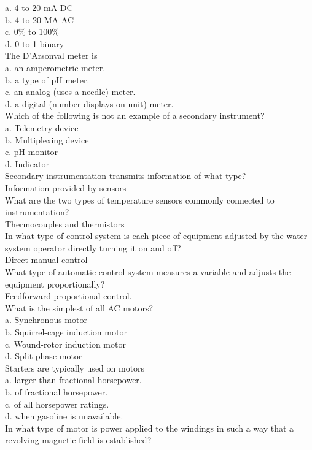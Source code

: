 a.	4 to 20 mA DC\\
b.	4 to 20 MA AC\\
c.	0\% to 100\%\\
d.	0 to 1 binary\\
The D'Arsonval meter is\\
a.	an amperometric meter.\\
b.	a type of pH meter.\\
c.	an analog (uses a needle) meter.\\
d.	a digital (number displays on unit) meter.\\
Which of the following is not an example of a secondary instrument?\\
a.	Telemetry device\\
b.	Multiplexing device\\
c.	pH monitor\\
d.	Indicator\\
Secondary instrumentation transmits information of what type?\\
Information provided by sensors\\
What are the two types of temperature sensors commonly connected to instrumentation?\\
Thermocouples and thermistors\\
In what type of control system is each piece of equipment adjusted by the water system operator directly turning it on and off?\\
Direct manual control\\
What type of automatic control system measures a variable and adjusts the equipment proportionally?\\
Feedforward proportional control.\\
What is the simplest of all AC motors?\\
a.	Synchronous motor\\
b.	Squirrel-cage induction motor\\
c.	Wound-rotor induction motor\\
d.	Split-phase motor\\
Starters are typically used on motors\\
a.	larger than fractional horsepower.\\
b.	of fractional horsepower.\\
c.	of all horsepower ratings.\\
d.	when gasoline is unavailable.\\
In what type of motor is power applied to the windings in such a way that a revolving magnetic field is established?\\
